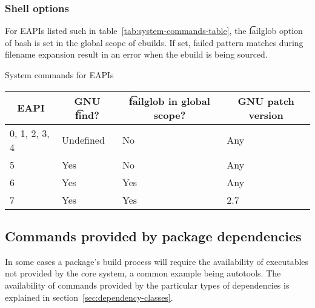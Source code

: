 \subsubsection{Shell options}

 For EAPIs listed such in table~\ref{tab:system-commands-table}, the
\t{failglob} option of bash is set in the global scope of ebuilds. If set, failed pattern matches
during filename expansion result in an error when the ebuild is being sourced.

\begin{centertable}{System commands for EAPIs}
    \label{tab:system-commands-table}
    \begin{tabular}{llll}
      \toprule
      \multicolumn{1}{c}{\textbf{EAPI}} &
      \multicolumn{1}{c}{\textbf{GNU \t{find}?}} &
      \multicolumn{1}{c}{\textbf{\t{failglob} in global scope?}} &
      \multicolumn{1}{c}{\textbf{GNU patch version}} \\
      \midrule
      0, 1, 2, 3, 4     & Undefined & No  & Any \\
      5                 & Yes       & No  & Any \\
      6                 & Yes       & Yes & Any \\
      7                 & Yes       & Yes & 2.7 \\
      \bottomrule
    \end{tabular}
\end{centertable}

\subsection{Commands provided by package dependencies}

In some cases a package's build process will require the availability of executables not provided by
the core system, a common example being autotools. The availability of commands provided by the
particular types of dependencies is explained in section~\ref{sec:dependency-classes}.




